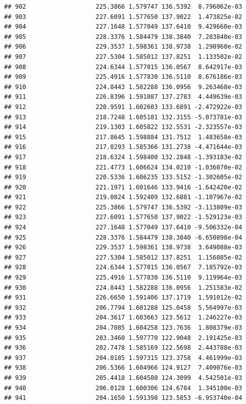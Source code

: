 \documentclass[
]{article}
\begin{document}
\begin{verbatim}
## 902                   225.3866 1.579747 136.5392  8.796062e-03
## 903                   227.6091 1.577650 137.9022  1.473825e-02
## 904                   227.1648 1.577049 137.6410  9.429660e-03
## 905                   228.3376 1.584479 138.3840  7.283840e-03
## 906                   229.3537 1.598361 138.9738  1.298960e-02
## 907                   227.5304 1.585012 137.8251  1.133502e-02
## 908                   224.6344 1.577015 136.0567  8.642917e-03
## 909                   225.4916 1.577830 136.5110  8.676186e-03
## 910                   224.8443 1.582288 136.0956  9.263468e-03
## 911                   226.8396 1.591087 137.2783  4.449639e-03
## 912                   220.9591 1.602603 133.6891 -2.472922e-03
## 913                   218.7248 1.605181 132.3155 -5.073781e-03
## 914                   219.1303 1.605822 132.5531 -2.323557e-03
## 915                   217.8645 1.598884 131.7512  1.483658e-03
## 916                   217.0293 1.585366 131.2738 -4.471644e-03
## 917                   218.6324 1.598400 132.2848 -1.393183e-02
## 918                   221.4773 1.606624 134.0210 -1.036070e-02
## 919                   220.5336 1.606235 133.5152 -1.302605e-02
## 920                   221.1971 1.601646 133.9416 -1.642420e-02
## 921                   219.0824 1.592409 132.6881 -1.107967e-02
## 922                   225.3866 1.579747 136.5392 -3.113809e-03
## 923                   227.6091 1.577650 137.9022 -1.529123e-03
## 924                   227.1648 1.577049 137.6410 -9.506332e-04
## 925                   228.3376 1.584479 138.3840 -6.650898e-04
## 926                   229.3537 1.598361 138.9738  3.649088e-03
## 927                   227.5304 1.585012 137.8251  1.156085e-02
## 928                   224.6344 1.577015 136.0567  7.185792e-03
## 929                   225.4916 1.577830 136.5110  9.119964e-03
## 930                   224.8443 1.582288 136.0956  1.251583e-02
## 931                   226.6650 1.591406 137.1719  1.591012e-02
## 932                   206.7794 1.601288 125.0458  5.564997e-03
## 933                   204.3617 1.603663 123.5612  1.246227e-03
## 934                   204.7085 1.604258 123.7636  1.808379e-03
## 935                   203.3460 1.597770 122.9048  2.191425e-03
## 936                   202.7478 1.585169 122.5698  2.443788e-03
## 937                   204.0185 1.597315 123.3758  4.461999e-03
## 938                   206.5366 1.604966 124.9127  7.409076e-03
## 939                   205.4418 1.604580 124.3099  4.542501e-03
## 940                   206.0128 1.600306 124.6784  1.345100e-03
## 941                   204.1650 1.591398 123.5853 -6.953740e-04

\end{verbatim}
\end{document}
